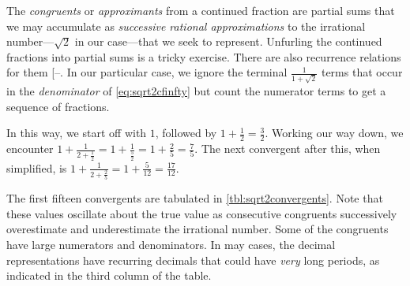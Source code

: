 \documentclass[
  a4paper,
]{article}
\begin{document}
The \emph{congruents} or \emph{approximants} from a continued fraction
are partial sums that we may accumulate as \emph{successive rational
approximations} to the irrational number---\(\sqrt{2}\) in our
case---that we seek to represent. Unfurling the continued fractions into
partial sums is a tricky exercise. There are also recurrence relations
for them {[}--\citeproc{ref-loya2017}{11}{]}.
In our particular case, we ignore the terminal
\(\frac{1}{1 + \sqrt{2}}\) terms that occur in the \emph{denominator} of
\cref{eq:sqrt2cfinfty} but count the numerator terms to get a sequence
of fractions.

In this way, we start off with \(1\), followed by
\(1 + \frac{1}{2} = \frac{3}{2}\). Working our way down, we encounter
\(1 + \frac{1}{2 + \frac{1}{2}} = 1+\frac{1}{\frac{5}{2}} = 1 + \frac{2}{5} = \frac{7}{5}\).
The next convergent after this, when simplified, is
\(1 + \frac{1}{2+\frac{2}{5}} = 1 + \frac{5}{12} = \frac{17}{12}\).

The first fifteen convergents are tabulated in
\cref{tbl:sqrt2convergents}. Note that these values oscillate about the
true value as consecutive congruents successively overestimate and
underestimate the irrational number. Some of the congruents have large
numerators and denominators. In may cases, the decimal representations
have recurring decimals that could have \emph{very} long periods, as
indicated in the third column of the table.
\end{document}
